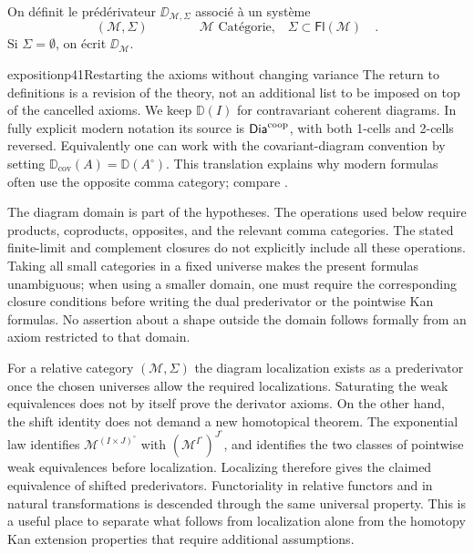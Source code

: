 On définit le prédérivateur $\DD_{\mathcal{M},\Sigma}$ associé à un système
\[ (\mathcal{M},\Sigma) \qquad\qquad \mathcal{M} \text{ Catégorie,} \quad \Sigma \subset \mathsf{Fl}(\mathcal{M}) \quad . \] %
Si $\Sigma = \emptyset$, on écrit $\DD_{\mathcal{M}}$.

\begin{dcomment}{exposition}{p41}{Restarting the axioms without changing variance}
The return to definitions is a revision of the theory, not an additional
list to be imposed on top of the cancelled axioms. We keep
$\mathbb D(I)$ for contravariant coherent diagrams. In fully explicit
modern notation its source is $\mathsf{Dia}^{\mathrm{coop}}$, with both
1-cells and 2-cells reversed. Equivalently one can work with the
covariant-diagram convention by setting
$\mathbb D_{\mathrm{cov}}(A)=\mathbb D(A^{\circ})$. This translation
explains why modern formulas often use the opposite comma category;
compare \citet[Warning~2.2]{GrothPontoShulman2014}.

The diagram domain is part of the hypotheses. The operations used below
require products, coproducts, opposites, and the relevant comma
categories. The stated finite-limit and complement closures do not
explicitly include all these operations. Taking all small categories
in a fixed universe makes the present formulas unambiguous; when using
a smaller domain, one must require the corresponding closure conditions
before writing the dual prederivator or the pointwise Kan formulas.
No assertion about a shape outside the domain follows formally from an
axiom restricted to that domain.

For a relative category $(\mathcal M,\Sigma)$ the diagram localization
exists as a prederivator once the chosen universes allow the required
localizations. Saturating the weak equivalences does not by itself
prove the derivator axioms. On the other hand, the shift identity does
not demand a new homotopical theorem. The exponential law identifies
$\mathcal M^{(I\times J)^{\circ}}$ with
$(\mathcal M^{I^{\circ}})^{J^{\circ}}$, and identifies the two
classes of pointwise weak equivalences before localization. Localizing
therefore gives the claimed equivalence of shifted prederivators.
Functoriality in relative functors and in natural transformations is
descended through the same universal property. This is a useful place
to separate what follows from localization alone from the homotopy Kan
extension properties that require additional assumptions.
\end{dcomment}


